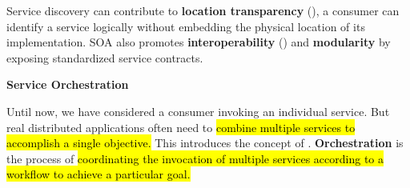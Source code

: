 Service discovery can contribute to \textbf{location transparency} (), a consumer can identify a service logically without embedding the physical location of its implementation. SOA also promotes \textbf{interoperability} () and \textbf{modularity} by exposing standardized service contracts.

\newpage
\begin{flushleft}
    \textcolor{Green3}{ \textbf{Service Orchestration}}
\end{flushleft}
Until now, we have considered a consumer invoking an individual service. But real distributed applications often need to \hl{combine multiple services to accomplish a single objective.} This introduces the concept of . \textbf{Orchestration} is the process of \hl{coordinating the invocation of multiple services according to a workflow to achieve a particular goal.}


